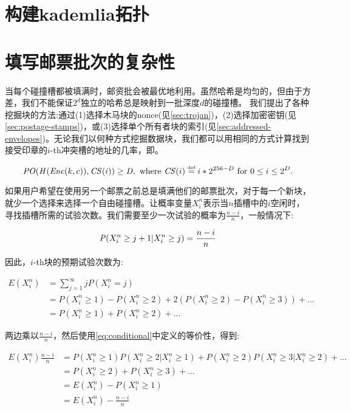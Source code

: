 \section{构建kademlia拓扑}

\section{填写邮票批次的复杂性\statusgreen}\label{sec:complexity-filling}

当每个碰撞槽都被填满时，邮资批会被最优地利用。虽然哈希是均匀的，但由于方差，我们不能保证$2^d$独立的哈希总是映射到一批深度$d$的碰撞槽。
我们提出了各种挖掘块的方法:通过(1)选择木马块的nonce(见\ref{sec:trojan})，(2)选择加密密钥(见\ref{sec:postage-stamps})，或(3)选择单个所有者块的索引(见\ref{sec:addressed-envelopes})。无论我们以何种方式挖掘数据块，我们都可以用相同的方式计算找到接受印章的$i$-th冲突槽的地址的几率，即。


\begin{equation}
\mathit{PO}(\mathit{H}(\mathit{Enc}(k, c)), \mathit{CS}(i))\geq\mathit{D},
\text{ where }\mathit{CS}(i)\overset{\textrm{\tiny def}}{=} i*2^{256-D}
\text{ for }0\leq i\leq  2^D.
\end{equation}

如果用户希望在使用另一个邮票之前总是填满他们的邮票批次，对于每一个新块，就少一个选择来选择一个自由碰撞槽。让概率变量$X^n_i$表示当$n$插槽中的$i$空闲时，寻找插槽所需的试验次数。我们需要至少一次试验的概率为$\frac{n-i}{n}$，一般情况下:


\begin{equation}\label{eq:conditional}
\mathit{P}(X^n_i\geq j+1|X^n_i\geq j)=\frac{n-i}{n}\\
\end{equation}

因此，$i$-th块的预期试验次数为: 

 \begin{subequations}   \begin{align}
\mathit{E}(X^n_i)&=\sum^\infty_{j=1}j\mathit{P}(X^n_i=j)\\
&=\mathit{P}(X^n_i\geq 1)-\mathit{P}(X^n_i\geq 2)+2(\mathit{P}(X^n_i\geq 2)-P(X^n_i\geq 3))+\ldots\\
&= \mathit{P}(X^n_i\geq 1)+\mathit{P}(X^n_i\geq 2)+\ldots
\end{align} \end{subequations}

两边乘以$\frac{n-i}{n}$，然后使用\ref{eq:conditional}中定义的等价性，得到:

 \begin{subequations}   \begin{align}
\mathit{E}(X^n_i)\frac{n-i}{n}&=\mathit{P}(X^n_i\geq 1)\mathit{P}(X^n_i\geq 2|X^n_i\geq 1)+\mathit{P}(X^n_i\geq 2)\mathit{P}(X^n_i\geq 3|X^n_i\geq 2)+\ldots\\
&=\mathit{P}(X^n_i\geq 2)+\mathit{P}(X^n_i\geq 3)+\ldots\\
&=\mathit{E}(X^n_i)-\mathit{P}(X^n_i\geq 1)\\
&=\mathit{E}(X^n_i)-\frac{n-i}{n}
\end{align} \end{subequations}

